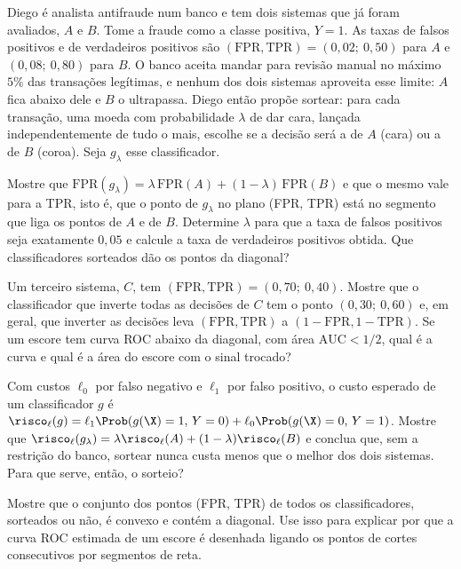 Diego é analista antifraude num banco e tem dois sistemas que já foram avaliados, $A$ e
$B$. Tome a fraude como a classe positiva, $Y=1$. As taxas de falsos positivos e de
verdadeiros positivos são $(\mathrm{FPR},\mathrm{TPR})=(0{,}02;\ 0{,}50)$ para $A$ e
$(0{,}08;\ 0{,}80)$ para $B$. O banco aceita mandar para revisão manual no máximo $5\%$ das
transações legítimas, e nenhum dos dois sistemas aproveita esse limite: $A$ fica abaixo
dele e $B$ o ultrapassa. Diego então propõe sortear: para cada transação, uma moeda com
probabilidade $\lambda$ de dar cara, lançada independentemente de tudo o mais, escolhe se a
decisão será a de $A$ (cara) ou a de $B$ (coroa). Seja $g_\lambda$ esse classificador.
\begin{itens}
  \item {} Mostre que
        $\mathrm{FPR}(g_\lambda)=\lambda\,\mathrm{FPR}(A)+(1-\lambda)\,\mathrm{FPR}(B)$ e
        que o mesmo vale para a TPR, isto é, que o ponto de $g_\lambda$ no plano
        (FPR, TPR) está no segmento que liga os pontos de $A$ e de $B$. Determine $\lambda$
        para que a taxa de falsos positivos seja exatamente $0{,}05$ e calcule a taxa de
        verdadeiros positivos obtida. Que classificadores sorteados dão os pontos da
        diagonal?
  \item {} Um terceiro sistema, $C$, tem $(\mathrm{FPR},\mathrm{TPR})=(0{,}70;\ 0{,}40)$.
        Mostre que o classificador que inverte todas as decisões de $C$ tem o ponto
        $(0{,}30;\ 0{,}60)$ e, em geral, que inverter as decisões leva
        $(\mathrm{FPR},\mathrm{TPR})$ a $(1-\mathrm{FPR},1-\mathrm{TPR})$. Se um escore tem
        curva ROC abaixo da diagonal, com área $\mathrm{AUC}<1/2$, qual é a curva e qual é a
        área do escore com o sinal trocado?
  \item {} Com custos $\ell_0$ por falso negativo e $\ell_1$ por falso positivo, o
        custo esperado de um classificador $g$ é
        $\risco_\ell(g)=\ell_1\Prob(g(\X)=1,\,Y=0)+\ell_0\Prob(g(\X)=0,\,Y=1)$. Mostre que
        $\risco_\ell(g_\lambda)=\lambda\risco_\ell(A)+(1-\lambda)\risco_\ell(B)$ e conclua
        que, sem a restrição do banco, sortear nunca custa menos que o melhor dos dois
        sistemas. Para que serve, então, o sorteio?
  \item {} Mostre que o conjunto dos pontos (FPR, TPR) de todos os classificadores,
        sorteados ou não, é convexo e contém a diagonal. Use isso para explicar por que a
        curva ROC estimada de um escore é desenhada ligando os pontos de cortes
        consecutivos por segmentos de reta.
\end{itens}

